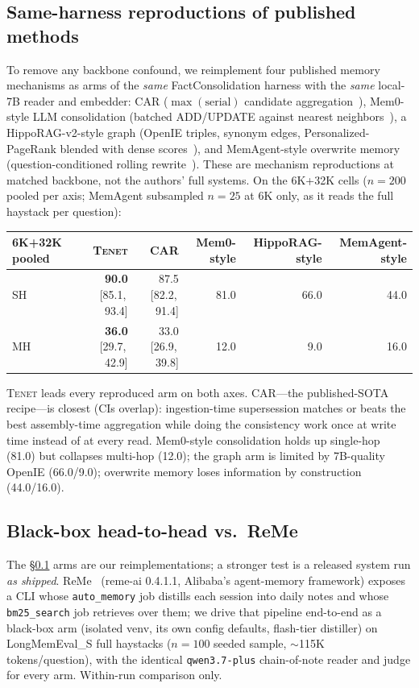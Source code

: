 \documentclass[11pt]{article}
\newcommand{\tenet}{\textsc{Tenet}}
\newcommand{\ci}[2]{{\footnotesize[#1,\,#2]}}
\begin{document}
\subsection{Same-harness reproductions of published methods}\label{sec:baselines}
To remove any backbone confound, we reimplement four published memory mechanisms as arms
of the \emph{same} FactConsolidation harness with the \emph{same} local-7B reader and
embedder: CAR ($\max(\text{serial})$ candidate aggregation~\cite{freshness}), Mem0-style
LLM consolidation (batched ADD/UPDATE against nearest neighbors~\cite{mem0}), a
HippoRAG-v2-style graph (OpenIE triples, synonym edges, Personalized-PageRank blended
with dense scores~\cite{hipporag2}), and MemAgent-style overwrite memory
(question-conditioned rolling rewrite~\cite{memagent}). These are mechanism
reproductions at matched backbone, not the authors' full systems. On the 6K+32K cells
($n{=}200$ pooled per axis; MemAgent subsampled $n{=}25$ at 6K only, as it reads the
full haystack per question):

\begin{center}
\small
\begin{tabular}{lrrrrr}
\toprule
6K+32K pooled & \tenet{} & CAR & Mem0-style & HippoRAG-style & MemAgent-style\\
\midrule
SH & \textbf{90.0} \ci{85.1}{93.4} & 87.5 \ci{82.2}{91.4} & 81.0 & 66.0 & 44.0\\
MH & \textbf{36.0} \ci{29.7}{42.9} & 33.0 \ci{26.9}{39.8} & 12.0 & 9.0 & 16.0\\
\bottomrule
\end{tabular}
\end{center}

\tenet{} leads every reproduced arm on both axes. CAR---the published-SOTA
recipe---is closest (CIs overlap): ingestion-time supersession matches or beats the best
assembly-time aggregation while doing the consistency work once at write time instead of
at every read. Mem0-style consolidation holds up single-hop (81.0) but collapses
multi-hop (12.0); the graph arm is limited by 7B-quality OpenIE (66.0/9.0); overwrite
memory loses information by construction (44.0/16.0).

\subsection{Black-box head-to-head vs.\ ReMe}\label{sec:reme}
The \S\ref{sec:baselines} arms are our reimplementations; a stronger test is a released
system run \emph{as shipped}. ReMe~\cite{reme} (reme-ai 0.4.1.1, Alibaba's agent-memory
framework) exposes a CLI whose \texttt{auto\_memory} job distills each session into
daily notes and whose \texttt{bm25\_search} job retrieves over them; we drive that
pipeline end-to-end as a black-box arm (isolated venv, its own config defaults,
flash-tier distiller) on LongMemEval\_S full haystacks ($n{=}100$ seeded sample,
$\sim$115K tokens/question), with the identical \texttt{qwen3.7-plus} chain-of-note
reader and judge for every arm. Within-run comparison only.
\end{document}
